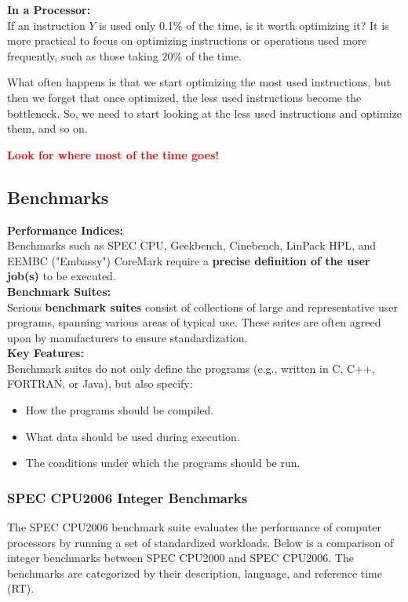 \textbf{In a Processor:} \\
If an instruction $Y$ is used only 0.1\% of the time, is it worth optimizing it? It is more practical to focus on optimizing instructions or operations used more frequently, such as those taking 20\% of the time.

What often happens is that we start optimizing the most used instructions, but then we forget that once optimized, the less used instructions become the bottleneck. So, we need to start looking at the less used instructions and optimize them, and so on.
\begin{center}
\textbf{\textcolor{red}{Look for where most of the time goes!}}
\end{center}

\subsection{Benchmarks}

\textbf{Performance Indices:} \\
Benchmarks such as SPEC CPU, Geekbench, Cinebench, LinPack HPL, and EEMBC ("Embassy") CoreMark require a \textbf{precise definition of the user job(s)} to be executed. \\

\textbf{Benchmark Suites:} \\
Serious \textbf{benchmark suites} consist of collections of large and representative user programs, spanning various areas of typical use. These suites are often agreed upon by manufacturers to ensure standardization. \\

\textbf{Key Features:} \\
Benchmark suites do not only define the programs (e.g., written in C, C++, FORTRAN, or Java), but also specify: \\
\begin{itemize}
    \item How the programs should be compiled.
    \item What data should be used during execution.
    \item The conditions under which the programs should be run.
\end{itemize}

\subsubsection{SPEC CPU2006 Integer Benchmarks}
The SPEC CPU2006 benchmark suite evaluates the performance of computer processors by running a set of standardized workloads. Below is a comparison of integer benchmarks between SPEC CPU2000 and SPEC CPU2006. The benchmarks are categorized by their description, language, and reference time (RT).


